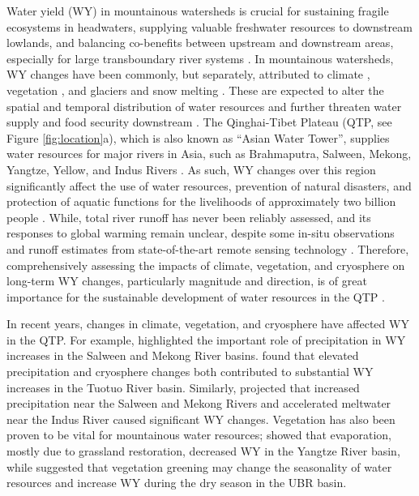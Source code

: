 \documentclass[hess, manuscript]{copernicus}
\begin{document}
\introduction
Water yield (WY) in mountainous watersheds is crucial for sustaining fragile ecosystems in headwaters, supplying valuable freshwater resources to downstream lowlands, and balancing co-benefits between upstream and downstream areas, especially for large transboundary river systems \citep{viviroli2011climate}. 
In mountainous watersheds, WY changes have been commonly, but separately, attributed to climate \citep{dierauer2018climate,song2021river}, vegetation \citep{goulden2014mountain,zhou2021divergent}, and glaciers and snow melting \citep{huss2018global, biemans2019importance}.
These are expected to alter the spatial and temporal distribution of water resources \citep{tang2019streamflow} and further threaten water supply and food security downstream \citep{biemans2019importance}.
The Qinghai-Tibet Plateau (QTP, see Figure \ref{fig:location}a), which is also known as “Asian Water Tower”, supplies water resources for major rivers in Asia, such as Brahmaputra, Salween, Mekong, Yangtze, Yellow, and Indus Rivers \citep{kang2010review,yao2010glacial,yao2019recent}. 
As such, WY changes over this region significantly affect the use of water resources, prevention of natural disasters, and protection of aquatic functions for the livelihoods of approximately two billion people \citep{immerzeel2010climate}. 
While, total river runoff has never been reliably assessed, and its responses to global warming remain unclear, despite some in-situ observations and runoff estimates from state-of-the-art remote sensing technology \citep{wang2021tp}.
Therefore, comprehensively assessing the impacts of climate, vegetation, and cryosphere on long-term WY changes, particularly magnitude and direction, is of great importance for the sustainable development of water resources in the  QTP \citep{yao2019recent}. 

In recent years, changes in climate, vegetation, and cryosphere have affected WY in the QTP. 
For example, \citet{fan2015temperature} highlighted the important role of precipitation in WY increases in the Salween and Mekong River basins. \citet{li2020substantial} found that elevated precipitation and cryosphere changes both contributed to substantial WY increases in the Tuotuo River basin. Similarly, \citet{lutz2014consistent} projected that increased precipitation near the Salween and Mekong Rivers and accelerated meltwater near the Indus River caused significant WY changes. 
Vegetation has also been proven to be vital for mountainous water resources; \citet{li2017grassland} showed that evaporation, mostly due to grassland restoration, decreased WY in the Yangtze River basin, while \citet{li2021vegetation} suggested that vegetation greening may change the seasonality of water resources and increase WY during the dry season in the UBR basin.
\end{document}
